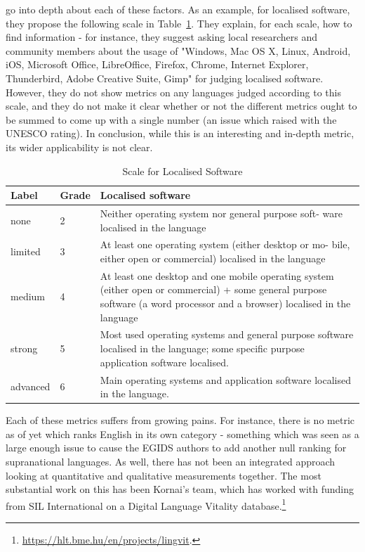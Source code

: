 \citet{soria2017digital} go into depth about each of these factors. As an example, for localised software, they propose the following scale in Table~\ref{table:dldp-software}. They explain, for each scale, how to find information - for instance, they suggest asking local researchers and community members about the usage of "Windows, Mac OS X, Linux, Android, iOS, Microsoft Office, LibreOffice, Firefox, Chrome, Internet Explorer, Thunderbird, Adobe Creative Suite, Gimp" for judging localised software. However, they do not show metrics on any languages judged according to this scale, and they do not make it clear whether or not the different metrics ought to be summed to come up with a single number (an issue which \citet{lee2016assessing} raised with the UNESCO rating). In conclusion, while this is an interesting and in-depth metric, its wider applicability is not clear.

\begin{table}
\begin{center}
\begin{tabular}{|p{2cm}|p{1.5cm}|p{9.5cm}|} \hline
Label & Grade & Localised software \\ \hline
none & 2 & Neither operating system nor general purpose soft- ware localised in the language\\ \hline
limited & 3 & At least one operating system (either desktop or mo- bile, either open or commercial) localised in the language \\ \hline
medium & 4 & At least one desktop and one mobile operating system (either open or commercial) + some general purpose software (a word processor and a browser) localised in the language\\ \hline
strong & 5 & Most used operating systems and general purpose software localised in the language; some specific purpose application software localised.\\ \hline
advanced & 6 & Main operating systems and application software localised in the language.  \\ \hline
\end{tabular}
\end{center}
\caption{Scale for Localised Software \citep[21]{soria2017digital}}
\label{table:dldp-software}
\end{table}

Each of these metrics suffers from growing pains. For instance, there is no metric as of yet which ranks English in its own category - something which was seen as a large enough issue to cause the EGIDS authors to add another null ranking for supranational languages. As well, there has not been an integrated approach looking at quantitative and qualitative measurements together. The most substantial work on this has been Kornai's team, which has worked with funding from SIL International on a Digital Language Vitality database.\footnote{\href{https://hlt.bme.hu/en/projects/lingvit}{https://hlt.bme.hu/en/projects/lingvit}. }

